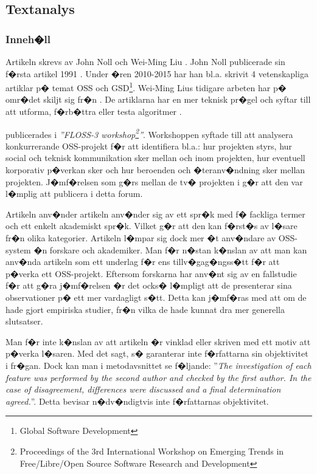 \documentclass[11pt, oneside]{article}   	%
\begin{document}
\subsection{Textanalys}
\subsubsection{Inneh�ll}
Artikeln skrevs av John Noll och Wei-Ming Liu \cite{Noll2010}. John Noll publicerade sin f�rsta artikel 1991 \cite{Angeles1991}. Under �ren 2010-2015 har han bl.a. skrivit 4 vetenskapliga artiklar\cite{Noll2010, Monasor2014a, Monasor2014, Clear2015} p� temat OSS och GSD\footnote{Global Software Development}. Wei-Ming Lius tidigare arbeten har p� omr�det skiljt sig fr�n \cite{Noll2010}. De artiklarna har en mer teknisk pr�gel och syftar till att utforma, f�rb�ttra eller testa algoritmer \cite{Li,Yang2011}.

\cite{Noll2010} publicerades i \emph{''FLOSS-3 workshop\footnote{Proceedings of the 3rd International Workshop on Emerging Trends in Free/Libre/Open Source Software Research and Development}''}. Workshoppen syftade till att analysera konkurrerande OSS-projekt f�r att identifiera bl.a.: hur projekten styrs, hur social och teknisk kommunikation sker mellan och inom projekten, hur eventuell korporativ p�verkan sker och hur beroenden och �teranv�ndning sker mellan projekten. J�mf�relsen som g�rs mellan de tv� projekten i \cite{Noll2010} g�r att den var l�mplig att publicera i detta forum.

Artikeln anv�nder artikeln anv�nder sig av ett spr�k med f� fackliga termer och ett enkelt akademiskt spr�k. Vilket g�r att den kan f�rst�s av l�sare fr�n olika kategorier. Artikeln l�mpar sig dock mer �t anv�ndare av OSS-system �n forskare och akademiker. Man f�r n�stan k�nslan av att man kan anv�nda artikeln som ett underlag f�r ens tillv�gag�ngss�tt f�r att p�verka ett OSS-projekt. Eftersom forskarna har anv�nt sig av en fallstudie f�r att g�ra j�mf�relsen �r det ocks� l�mpligt att de presenterar sina observationer p� ett mer vardagligt s�tt. Detta kan j�mf�ras med att om de hade gjort empiriska studier, fr�n vilka de hade kunnat dra mer generella slutsatser.

Man f�r inte k�nslan av att artikeln �r vinklad eller skriven med ett motiv att p�verka l�saren. Med det sagt, s� garanterar inte f�rfattarna sin objektivitet i fr�gan. Dock kan man i metodavsnittet se f�ljande: ''\emph{The investigation of each feature was performed by the second author and checked by the first author. In the case of disagreement, differences were discussed and a final determination agreed.}''. Detta bevisar n�dv�ndigtvis inte f�rfattarnas objektivitet.
\end{document}

